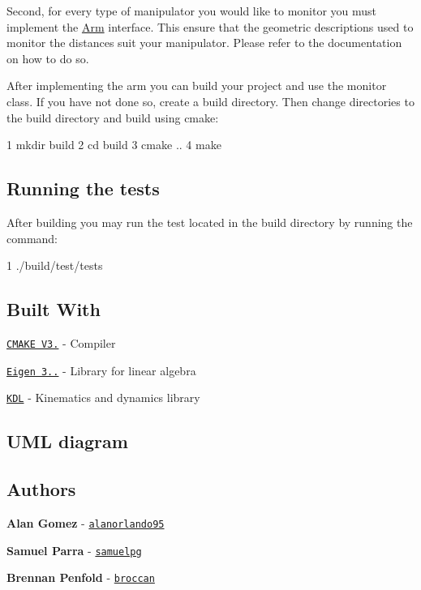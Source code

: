 Second, for every type of manipulator you would like to monitor you must implement the \hyperlink{class_arm}{Arm} interface. This ensure that the geometric descriptions used to monitor the distances suit your manipulator. Please refer to the documentation on how to do so.

After implementing the arm you can build your project and use the monitor class. If you have not done so, create a build directory. Then change directories to the build directory and build using cmake\+:


\begin{DoxyCode}
1 mkdir build
2 cd build
3 cmake ..
4 make
\end{DoxyCode}


\subsection*{Running the tests}

After building you may run the test located in the build directory by running the command\+:


\begin{DoxyCode}
1 ./build/test/tests
\end{DoxyCode}


\subsection*{Built With}


\begin{DoxyItemize}
\item \href{https://cmake.org/download/}{\tt C\+M\+A\+KE V3.} -\/ Compiler
\item \href{http://eigen.tuxfamily.org}{\tt Eigen 3..} -\/ Library for linear algebra
\item \href{https://www.orocos.org/kdl/installation-manual}{\tt K\+DL} -\/ Kinematics and dynamics library
\end{DoxyItemize}

\subsection*{U\+ML diagram}

 

\subsection*{Authors}


\begin{DoxyItemize}
\item {\bfseries Alan Gomez} -\/ \href{https://github.com/alanorlando95}{\tt alanorlando95}
\item {\bfseries Samuel Parra} -\/ \href{https://github.com/samuelpg}{\tt samuelpg}
\item {\bfseries Brennan Penfold} -\/ \href{https://github.com/broccan}{\tt broccan}
\end{DoxyItemize}

